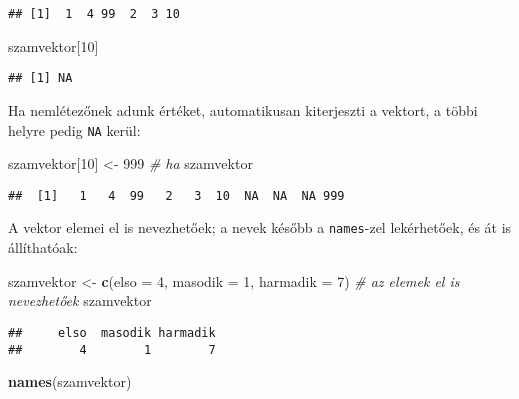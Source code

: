 \documentclass[]{book}
\newenvironment{Shaded}{\begin{snugshade}}{\end{snugshade}}
\newcommand{\KeywordTok}[1]{\textcolor[rgb]{0.13,0.29,0.53}{\textbf{#1}}}
\newcommand{\DataTypeTok}[1]{\textcolor[rgb]{0.13,0.29,0.53}{#1}}
\newcommand{\DecValTok}[1]{\textcolor[rgb]{0.00,0.00,0.81}{#1}}
\newcommand{\StringTok}[1]{\textcolor[rgb]{0.31,0.60,0.02}{#1}}
\newcommand{\CommentTok}[1]{\textcolor[rgb]{0.56,0.35,0.01}{\textit{#1}}}
\newcommand{\NormalTok}[1]{#1}
\begin{document}
\begin{verbatim}
## [1]  1  4 99  2  3 10
\end{verbatim}

\begin{Shaded}
\begin{Highlighting}[]
\NormalTok{szamvektor[}\DecValTok{10}\NormalTok{]}
\end{Highlighting}
\end{Shaded}

\begin{verbatim}
## [1] NA
\end{verbatim}

Ha nemlétezőnek adunk értéket, automatikusan kiterjeszti a vektort, a
többi helyre pedig \texttt{NA} kerül:

\begin{Shaded}
\begin{Highlighting}[]
\NormalTok{szamvektor[}\DecValTok{10}\NormalTok{] <-}\StringTok{ }\DecValTok{999}  \CommentTok{# ha}
\NormalTok{szamvektor}
\end{Highlighting}
\end{Shaded}

\begin{verbatim}
##  [1]   1   4  99   2   3  10  NA  NA  NA 999
\end{verbatim}

A vektor elemei el is nevezhetőek; a nevek később a \texttt{names}-zel
lekérhetőek, és át is állíthatóak:

\begin{Shaded}
\begin{Highlighting}[]
\NormalTok{szamvektor <-}\StringTok{ }\KeywordTok{c}\NormalTok{(}\DataTypeTok{elso =} \DecValTok{4}\NormalTok{, }\DataTypeTok{masodik =} \DecValTok{1}\NormalTok{, }\DataTypeTok{harmadik =} \DecValTok{7}\NormalTok{)  }\CommentTok{# az elemek el is nevezhetőek}
\NormalTok{szamvektor}
\end{Highlighting}
\end{Shaded}

\begin{verbatim}
##     elso  masodik harmadik 
##        4        1        7
\end{verbatim}

\begin{Shaded}
\begin{Highlighting}[]
\KeywordTok{names}\NormalTok{(szamvektor)}
\end{Highlighting}
\end{Shaded}
\end{document}
